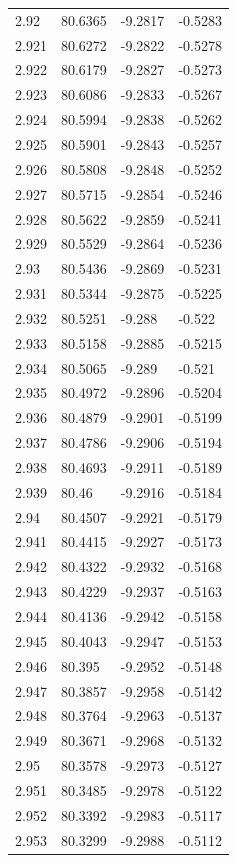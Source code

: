\begin{tabular}{llll}
2.92 & 80.6365 & -9.2817 & -0.5283 \\
2.921 & 80.6272 & -9.2822 & -0.5278 \\
2.922 & 80.6179 & -9.2827 & -0.5273 \\
2.923 & 80.6086 & -9.2833 & -0.5267 \\
2.924 & 80.5994 & -9.2838 & -0.5262 \\
2.925 & 80.5901 & -9.2843 & -0.5257 \\
2.926 & 80.5808 & -9.2848 & -0.5252 \\
2.927 & 80.5715 & -9.2854 & -0.5246 \\
2.928 & 80.5622 & -9.2859 & -0.5241 \\
2.929 & 80.5529 & -9.2864 & -0.5236 \\
2.93 & 80.5436 & -9.2869 & -0.5231 \\
2.931 & 80.5344 & -9.2875 & -0.5225 \\
2.932 & 80.5251 & -9.288 & -0.522 \\
2.933 & 80.5158 & -9.2885 & -0.5215 \\
2.934 & 80.5065 & -9.289 & -0.521 \\
2.935 & 80.4972 & -9.2896 & -0.5204 \\
2.936 & 80.4879 & -9.2901 & -0.5199 \\
2.937 & 80.4786 & -9.2906 & -0.5194 \\
2.938 & 80.4693 & -9.2911 & -0.5189 \\
2.939 & 80.46 & -9.2916 & -0.5184 \\
2.94 & 80.4507 & -9.2921 & -0.5179 \\
2.941 & 80.4415 & -9.2927 & -0.5173 \\
2.942 & 80.4322 & -9.2932 & -0.5168 \\
2.943 & 80.4229 & -9.2937 & -0.5163 \\
2.944 & 80.4136 & -9.2942 & -0.5158 \\
2.945 & 80.4043 & -9.2947 & -0.5153 \\
2.946 & 80.395 & -9.2952 & -0.5148 \\
2.947 & 80.3857 & -9.2958 & -0.5142 \\
2.948 & 80.3764 & -9.2963 & -0.5137 \\
2.949 & 80.3671 & -9.2968 & -0.5132 \\
2.95 & 80.3578 & -9.2973 & -0.5127 \\
2.951 & 80.3485 & -9.2978 & -0.5122 \\
2.952 & 80.3392 & -9.2983 & -0.5117 \\
2.953 & 80.3299 & -9.2988 & -0.5112 \\

\end{tabular}

